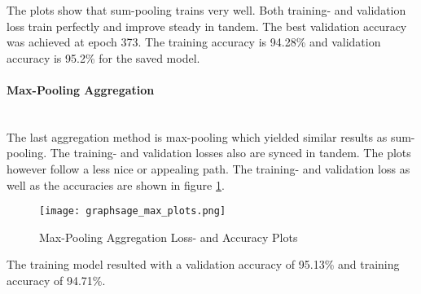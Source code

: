   \noindent The plots show that sum-pooling trains very well. Both training- 
  and validation loss train perfectly and improve steady in 
  tandem. The best validation accuracy was achieved at epoch 373.
  The training accuracy is 94.28\% and validation accuracy is 95.2\% for the
  saved model. 

  \paragraph{Max-Pooling Aggregation}  \mbox{}\\ 
  The last aggregation method is max-pooling which yielded similar results as
  sum-pooling. The training- and validation losses also are synced in tandem.
  The plots however follow a less nice or appealing path. The training- and
  validation loss as well as the accuracies are shown in figure
  \ref{fig:max_aggregation}. 

  \begin{figure}[h]
		\centering
		\texttt{[image: graphsage\_max\_plots.png]}
		\caption{Max-Pooling Aggregation Loss- and Accuracy Plots}
        \label{fig:max_aggregation}
  \end{figure}

  \noindent The training model resulted with a validation accuracy
  of 95.13\% and training accuracy of 94.71\%. 
